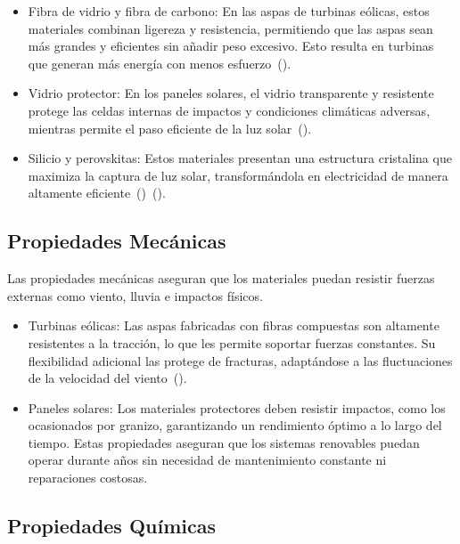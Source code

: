 \documentclass[letterpaper, 12pt]{article}
\begin{document}
\begin{itemize}
      \item Fibra de vidrio y fibra de carbono: En las aspas de turbinas eólicas, estos
            materiales combinan ligereza y resistencia, permitiendo que las aspas sean más
            grandes y eficientes sin añadir peso excesivo. Esto resulta en turbinas que
            generan más energía con menos esfuerzo~(\cite{Galembeck2019}).

      \item Vidrio protector: En los paneles solares, el vidrio transparente y resistente
            protege las celdas internas de impactos y condiciones climáticas adversas,
            mientras permite el paso eficiente de la luz solar~(\cite{Henriksson2021}).

      \item Silicio y perovskitas: Estos materiales presentan una estructura cristalina que
            maximiza la captura de luz solar, transformándola en electricidad de manera
            altamente eficiente~(\cite{Henriksson2021})~(\cite{Galembeck2019}).
\end{itemize}

\subsection{Propiedades Mecánicas}

Las propiedades mecánicas aseguran que los materiales puedan resistir fuerzas
externas como viento, lluvia e impactos físicos.

\begin{itemize}
      \item Turbinas eólicas: Las aspas fabricadas con fibras compuestas son altamente
            resistentes a la tracción, lo que les permite soportar fuerzas constantes. Su
            flexibilidad adicional las protege de fracturas, adaptándose a las
            fluctuaciones de la velocidad del viento~(\cite{Ebhota_Jen2019}).

      \item Paneles solares: Los materiales protectores deben resistir impactos, como los
            ocasionados por granizo, garantizando un rendimiento óptimo a lo largo del
            tiempo. Estas propiedades aseguran que los sistemas renovables puedan operar
            durante años sin necesidad de mantenimiento constante ni reparaciones costosas.
\end{itemize}

\subsection{Propiedades Químicas}
\end{document}
